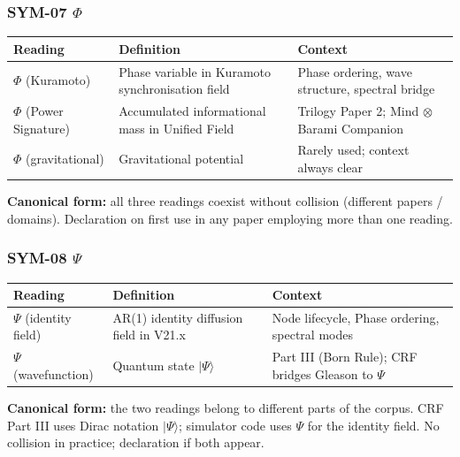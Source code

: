 \documentclass[12pt, a4paper]{article}
\begin{document}
\subsubsection*{SYM-07 \quad $\Phi$}

\begin{yellowbox}[title={SYM-07 \textmd{---} $\Phi$ \textmd{(three readings)}}]
\renewcommand{\arraystretch}{1.35}
\begin{tabular}{p{2.8cm} p{4.5cm} p{4.5cm}}
\toprule
\textbf{Reading} & \textbf{Definition} & \textbf{Context}\\
\midrule
$\Phi$ (Kuramoto) &
  Phase variable in Kuramoto synchronisation field &
  Phase ordering, wave structure, spectral bridge\\
$\Phi$ (Power Signature) &
  Accumulated informational mass in Unified Field &
  Trilogy Paper 2; Mind $\otimes$ Barami Companion\\
$\Phi$ (gravitational) &
  Gravitational potential &
  Rarely used; context always clear\\
\bottomrule
\end{tabular}

\medskip
\textbf{Canonical form:} all three readings coexist without
collision (different papers / domains). Declaration on first use
in any paper employing more than one reading.
\end{yellowbox}

\subsubsection*{SYM-08 \quad $\Psi$}

\begin{yellowbox}[title={SYM-08 \textmd{---} $\Psi$ \textmd{(two readings)}}]
\renewcommand{\arraystretch}{1.35}
\begin{tabular}{p{2.8cm} p{4.5cm} p{4.5cm}}
\toprule
\textbf{Reading} & \textbf{Definition} & \textbf{Context}\\
\midrule
$\Psi$ (identity field) &
  AR(1) identity diffusion field in V21.x &
  Node lifecycle, Phase ordering, spectral modes\\
$\Psi$ (wavefunction) &
  Quantum state $|\Psi\rangle$ &
  Part III (Born Rule); CRF bridges Gleason to $\Psi$\\
\bottomrule
\end{tabular}

\medskip
\textbf{Canonical form:} the two readings belong to different
parts of the corpus. CRF Part III uses Dirac notation
$|\Psi\rangle$; simulator code uses $\Psi$ for the identity field.
No collision in practice; declaration if both appear.
\end{yellowbox}
\end{document}
